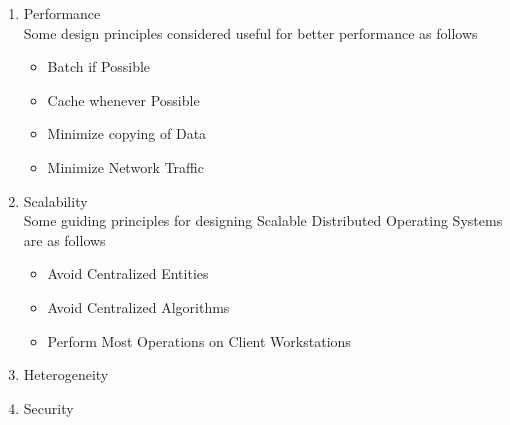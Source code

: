 \documentclass{beamer}
\begin{document}
\begin{frame}[allowframebreaks]
\begin{enumerate}
      	\framebreak
      	\item Performance\\
      		Some design principles considered useful for better performance as follows
      		\vspace{0.5cm}
      		\begin{itemize}
      			\item Batch if Possible
      			\item Cache whenever Possible
      			\item Minimize copying of Data
      			\item Minimize Network Traffic
      		\end{itemize}
      		\vspace{4cm}
      		\framebreak
      	\item Scalability\\
      		\vspace{0.5cm}
      		Some guiding principles for designing Scalable Distributed Operating Systems are as follows
      		\begin{itemize}
      			\item Avoid Centralized Entities
      			\item Avoid Centralized Algorithms
      			\item Perform Most Operations on Client Workstations
      		\end{itemize}
      		\vspace{1cm}
      	\item Heterogeneity
      	\item Security
    \end{enumerate}   
    \vspace{2cm}
\end{frame} 
\end{document}
